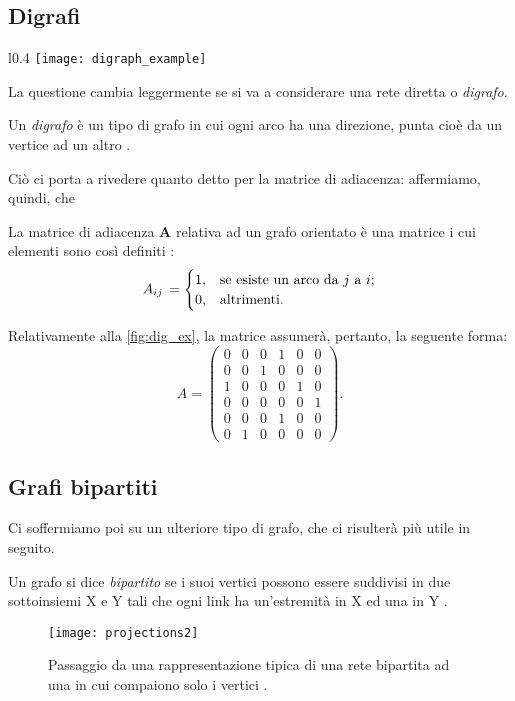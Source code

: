 \subsection{Digrafi}
\begin{wrapfigure}{l}{0.4\textwidth}
		\texttt{[image: digraph\_example]}
		\caption{Un digrafo \cite{Newman}.}
		\label{fig:dig_ex}
\end{wrapfigure}
La questione cambia leggermente se si va a considerare una rete diretta o \emph{digrafo}.
\begin{definizione}
Un \emph{digrafo} è un tipo di grafo in cui ogni arco ha una direzione, punta cioè da un vertice ad un altro \cite{Newman}.
\end{definizione}
Ciò ci porta a rivedere quanto detto per la matrice di adiacenza: affermiamo, quindi, che
\begin{definizione}
La matrice di adiacenza \textbf{A} relativa ad un grafo orientato è una matrice i cui elementi sono così definiti \cite{Newman}:
\[
A_{ij} \, =
\begin{cases}
1, & \text{se esiste un arco da $ j $ a $ i $};\\ 
0, & \text{altrimenti}.
\end{cases}
\]
\end{definizione}

Relativamente alla \cref{fig:dig_ex}, la matrice assumerà, pertanto, la seguente forma: \\
\begin{equation}
A =
\begin{pmatrix}
0 & 0 & 0 & 1 & 0 & 0 \\
0 & 0 & 1 & 0 & 0 & 0 \\
1 & 0 & 0 & 0 & 1 & 0 \\
0 & 0 & 0 & 0 & 0 & 1 \\
0 & 0 & 0 & 1 & 0 & 0 \\
0 & 1 & 0 & 0 & 0 & 0
\end{pmatrix} .
\end{equation}
\subsection{Grafi bipartiti}
Ci soffermiamo poi su un ulteriore tipo di grafo, che ci risulterà più utile in seguito.
\begin{definizione} 
Un grafo si dice \emph{bipartito} se i suoi vertici possono essere suddivisi in due sottoinsiemi X e Y tali che ogni link ha un'estremità in X ed una in Y \cite{Bondy}. 
\end{definizione}
\begin{figure}[h]
	\begin{center}
		\texttt{[image: projections2]}
		\caption{Passaggio da una rappresentazione tipica di una rete bipartita ad una in cui compaiono solo i vertici \cite{Newman}.}
		\label{fig:proj2}
	\end{center}
\end{figure}

